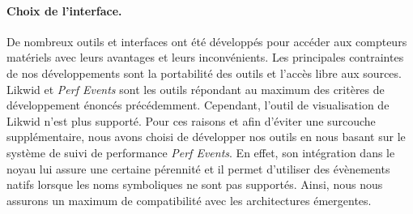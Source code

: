         \paragraph{Choix de l'interface.}  De nombreux outils et interfaces ont été développés pour accéder aux compteurs matériels avec leurs avantages et leurs inconvénients. Les principales contraintes de nos développements sont la portabilité des outils et l'accès libre aux sources. Likwid et \textit{Perf Events} sont les outils répondant au maximum des critères de développement énoncés précédemment. Cependant, l'outil de visualisation de Likwid n'est plus supporté. Pour ces raisons et afin d'éviter une surcouche supplémentaire, nous avons choisi de développer nos outils en nous basant sur le système de suivi de performance \textit{Perf Events}. En effet, son intégration dans le noyau lui assure une certaine pérennité et il permet d'utiliser des évènements natifs lorsque les noms symboliques ne sont pas supportés. Ainsi, nous nous assurons un maximum de compatibilité avec les architectures émergentes.

        
            
        
                  
        
        
        

